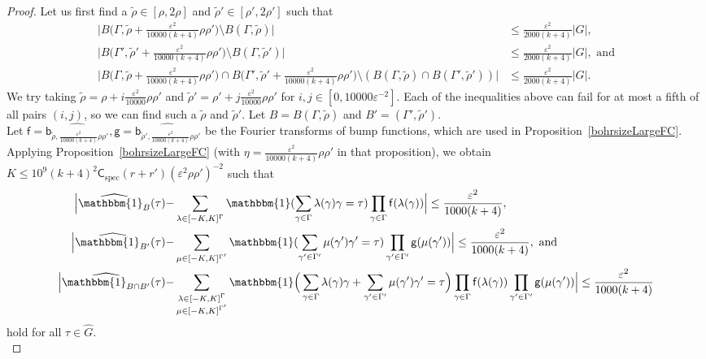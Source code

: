 \documentclass[10pt,a4paper]{amsart}
\newcommand\id{\mathbbm{1}}
\newcommand{\on}[1]{
	\operatorname{#1}
}
\newcommand\ssk[1]{
	\substack{#1}
}
\begin{document}
\begin{proof}
    Let us first find a $\tilde{\rho} \in [\rho, 2\rho]$ and $\tilde{\rho}' \in [\rho', 2\rho']$ such that 
    \begin{align*}
    \Big|B\Big(\Gamma, \tilde{\rho} + \frac{\varepsilon^2}{10000(k+4)}\rho\rho'\Big) \setminus B(\Gamma, \tilde{\rho})\Big| & \leq \frac{\varepsilon^2}{2000(k+4)}|G|,\\
    \Big| B\Big(\Gamma', \tilde{\rho}' + \frac{\varepsilon^2}{10000(k+4)}\rho\rho'\Big) \setminus B(\Gamma, \tilde{\rho}')\Big| & \leq \frac{\varepsilon^2}{2000(k+4)}|G|,\text{ and}\\
    \Big|B\Big(\Gamma, \tilde{\rho} + \frac{\varepsilon^2}{10000(k+4)}\rho\rho'\Big) \cap  B\Big(\Gamma', \tilde{\rho}' + \frac{\varepsilon^2}{10000(k+4)}\rho\rho'\Big) \setminus (B(\Gamma, \tilde{\rho}) \cap B(\Gamma', \tilde{\rho}')) \Big| & \leq \frac{\varepsilon^2}{2000(k+4)}|G|.
    \end{align*}
    We try taking $\tilde{\rho} = \rho + i \frac{\varepsilon^2}{10000}\rho\rho'$ and $\tilde{\rho}' = \rho' + j \frac{\varepsilon^2}{10000}\rho\rho'$ for $i, j \in [0, 10000 \varepsilon^{-2}]$. Each of the inequalities above can fail for at most a fifth of all pairs $(i,j)$, so we can find such a $\tilde{\rho}$ and $\tilde{\rho}'$. Let $B = B(\Gamma, \tilde{\rho})$ and $B' = (\Gamma', \tilde{\rho}')$.\\

    Let $\mathsf{f} = \widehat{\mathsf{b}_{\tilde{\rho}, \frac{\varepsilon^2}{10000(k+4)}\rho\rho'}}, \mathsf{g} = \widehat{\mathsf{b}_{\tilde{\rho}', \frac{\varepsilon^2}{10000(k+4)}\rho\rho'}}$ be the Fourier transforms of bump functions, which are used in Proposition~\ref{bohrsizeLargeFC}. Applying Proposition~\ref{bohrsizeLargeFC} (with $\eta = \frac{\varepsilon^2}{10000(k+4)}\rho\rho'$ in that proposition), we obtain $K \leq 10^9 (k+4)^2 \mathsf{C}_{\on{spec}} (r + r')(\varepsilon^{2} \rho\rho')^{-2}$ such that 
    \begin{align*}\Big|\widehat{\id_B}(\tau) - & \sum_{\lambda \in [-K, K]^\Gamma} \id(\sum_{\gamma \in \Gamma} \lambda(\gamma)\gamma = \tau) \prod_{\gamma \in \Gamma} \mathsf{f}(\lambda(\gamma)) \Big|\leq \frac{\varepsilon^2}{1000(k+4)},\\
    \Big|\widehat{\id_{B'}}(\tau) - & \sum_{\mu \in [-K, K]^{\Gamma'}} \id(\sum_{\gamma' \in \Gamma'} \mu(\gamma')\gamma' = \tau) \prod_{\gamma' \in \Gamma'} \mathsf{g}(\mu(\gamma')) \Big|\leq \frac{\varepsilon^2}{1000(k+4)},\text{ and}\\
    \Big|\widehat{\id_{B \cap B'}}(\tau) - & \sum_{\ssk{\lambda \in [-K, K]^\Gamma\\\mu \in [-K, K]^{\Gamma'}}} \id\Big(\sum_{\gamma \in \Gamma}  \lambda(\gamma)\gamma + \sum_{\gamma' \in \Gamma'} \mu(\gamma')\gamma' = \tau\Big) \prod_{\gamma \in \Gamma} \mathsf{f}(\lambda(\gamma))\prod_{\gamma' \in \Gamma'} \mathsf{g}(\mu(\gamma'))  \Big|\leq \frac{\varepsilon^2}{1000(k+4)}\end{align*}
    hold for all $\tau \in \hat{G}$.\\


\end{proof}
\end{document}
